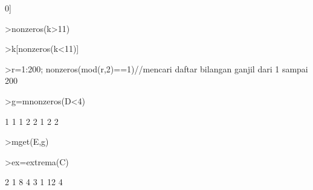 \documentclass[a4paper,10pt]{article}
\begin{document}
\begin{eulernotebook}
\begin{eulercomment}
\begin{eulercomment}
\begin{euleroutput}
  0]
\end{euleroutput}
\begin{eulerprompt}
>nonzeros(k>11)
\end{eulerprompt}
\begin{euleroutput}
  [11,  12,  13,  14,  15,  16,  17,  18,  19]
\end{euleroutput}
\begin{eulerprompt}
>k[nonzeros(k<11)]
\end{eulerprompt}
\begin{euleroutput}
  [2,  3,  4,  5,  6,  7,  8,  9,  10]
\end{euleroutput}
\begin{eulerprompt}
>r=1:200; nonzeros(mod(r,2)==1)//mencari daftar bilangan ganjil dari 1 sampai 200
\end{eulerprompt}
\begin{euleroutput}
  [1,  3,  5,  7,  9,  11,  13,  15,  17,  19,  21,  23,  25,  27,  29,
  31,  33,  35,  37,  39,  41,  43,  45,  47,  49,  51,  53,  55,  57,
  59,  61,  63,  65,  67,  69,  71,  73,  75,  77,  79,  81,  83,  85,
  87,  89,  91,  93,  95,  97,  99,  101,  103,  105,  107,  109,  111,
  113,  115,  117,  119,  121,  123,  125,  127,  129,  131,  133,  135,
  137,  139,  141,  143,  145,  147,  149,  151,  153,  155,  157,  159,
  161,  163,  165,  167,  169,  171,  173,  175,  177,  179,  181,  183,
  185,  187,  189,  191,  193,  195,  197,  199]
\end{euleroutput}
\begin{eulerprompt}
>g=mnonzeros(D<4)
\end{eulerprompt}
\begin{euleroutput}
              1             1 
              1             2 
              2             1 
              2             2 
\end{euleroutput}
\begin{eulerprompt}
>mget(E,g)
\end{eulerprompt}
\begin{euleroutput}
  [3,  2,  4,  3]
\end{euleroutput}
\begin{eulerprompt}
>ex=extrema(C)
\end{eulerprompt}
\begin{euleroutput}
              2             1             8             4 
              3             1            12             4 
\end{euleroutput}
\begin{eulercomment}

\end{eulercomment}
\end{eulercomment}
\end{eulercomment}
\end{eulernotebook}
\end{document}
